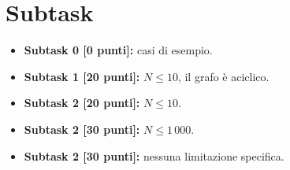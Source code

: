 \documentclass[a4paper,11pt]{article}
\begin{document}
\section*{Subtask}
\begin{itemize}
    \item \textbf{Subtask 0 [\phantom{1}0 punti]:} casi di esempio.
    \item \textbf{Subtask 1 [20 punti]:} $N \le 10$, il grafo è aciclico.
    \item \textbf{Subtask 2 [20 punti]:} $N \le 10$.
    \item \textbf{Subtask 2 [30 punti]:} $N \le 1\,000$.
    \item \textbf{Subtask 2 [30 punti]:} nessuna limitazione specifica.
\end{itemize}
\end{document}
